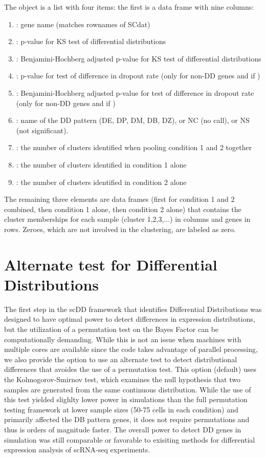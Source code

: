\documentclass{article}
\begin{document}
The  object is a list with four items: the first is a data frame with nine columns: 
\begin{enumerate}
  \item {}: gene name (matches rownames of SCdat)
  \item {}: p-value for KS test of differential distributions
  \item {}: Benjamini-Hochberg adjusted p-value for KS test of differential distributions
  \item {}: p-value for test of difference in dropout rate (only for non-DD genes and if )
  \item {}: Benjamini-Hochberg adjusted p-value for test of difference in dropout rate (only for non-DD genes and if )
  \item {}: name of the DD pattern (DE, DP, DM, DB, DZ), or NC (no call), or NS (not significant).  
  \item {}: the number of clusters identified when pooling condition 1 and 2 together
  \item {}: the number of clusters identified in condition 1 alone
  \item {}: the number of clusters identified in condition 2 alone
\end{enumerate}
  The remaining three elements are data frames (first for condition 1 and 2 combined, then condition 1 alone, then condition 2 alone) that contains the cluster memberships for each sample (cluster 1,2,3,...) in columns and genes in rows.  Zeroes, which are not involved in the clustering, are labeled as zero.  

\section{Alternate test for Differential Distributions}

The first step in the scDD framework that identifies Differential Distributions was designed to have optimal power to detect differences in expression distributions, but the utilization of a permutation test on the Bayes Factor can be computationally demanding.  While this is not an issue when machines with multiple cores are available since the code takes advantage of parallel processing, we also provide the option to use an alternate test to detect distributional differences that avoides the use of a permutation test.  This option (default) uses the Kolmogorov-Smirnov test, which examines the null hypothesis that two samples are generated from the same continuous distribution.  While the use of this test yielded slighlty lower power in simulations than the full permutation testing framework at lower sample sizes (50-75 cells in each condition) and primarily affected the DB pattern genes, it does not require permutations and thus is orders of magnitude faster.  The overall power to detect DD genes in simulation was still comparable or favorable to exisiting methods for differential expression analysis of scRNA-seq experiments. 
\end{document}
